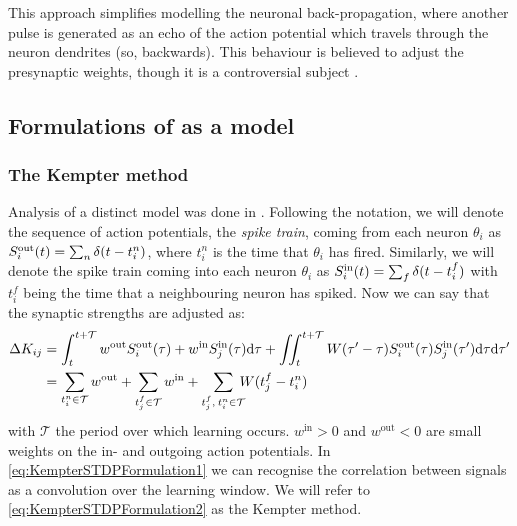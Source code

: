 
This approach simplifies modelling the neuronal back-propagation, where another pulse is generated as an echo of the action potential which travels through the neuron dendrites (so, backwards). This behaviour is believed to adjust the presynaptic weights, though it is a controversial subject \cite{Gerstner2002}. 


\subsection{Formulations of \STDP as a model}
\subsubsection{The Kempter method}
Analysis of a distinct \STDP model was done in \cite{Kempter1999}. Following the notation, we will denote the sequence of action potentials, the \textsl{spike train}, coming from each neuron $\theta_i$ as $S_i^{\rm out}(t) = \sum_{n} \delta (t-t_{i}^{n})$, where $t_{i}^{n}$ is the time that $\theta_i$ has fired. Similarly, we will denote the spike train coming into each neuron $\theta_i$ as $S_i^{\rm in}(t) = \sum_{f} \delta (t-t_{i}^{f})$ with $t_{i}^{f}$ being the time that a neighbouring neuron has spiked. Now we can say that the synaptic strengths are adjusted as:
\begin{align}
\Delta K_{ij} &= \int_{t}^{t+\mathcal{T}} w^{\rm{out}} S_i^{\rm out}(\tau) + w^{\rm{in}} S_{j}^{\rm {in}}(\tau) \mathrm{d}\tau
+ \iint_{t}^{t+\mathcal{T}} W( \tau^\prime - \tau) S_{i}^{\rm out}(\tau) S_{j}^{\rm in}( \tau^\prime) \mathrm{d} \tau \mathrm{d} \tau^\prime
\label{eq:KempterSTDPFormulation1} \\
&= \sum_{t_i^{n}\in \mathcal{T}} w^{\mathrm{out}} + \sum_{t_{j}^{f} \in \mathcal{T}} w^{\mathrm{in}} + \sum_{t_{j}^{f}, \: t_i^{n} \in \mathcal{T}} \hspace{-2mm} W (t_{j}^{f}-t_i^{n} ) \label{eq:KempterSTDPFormulation2}
\end{align}
with $\mathcal{T}$ the period over which learning occurs. $w^{\mathrm{in}} > 0$ and $w^{\mathrm{out}} < 0$ are small weights on the in- and outgoing action potentials. In \eqref{eq:KempterSTDPFormulation1} we can recognise the correlation between signals as a convolution over the learning window. We will refer to \eqref{eq:KempterSTDPFormulation2} as the Kempter method. \\

